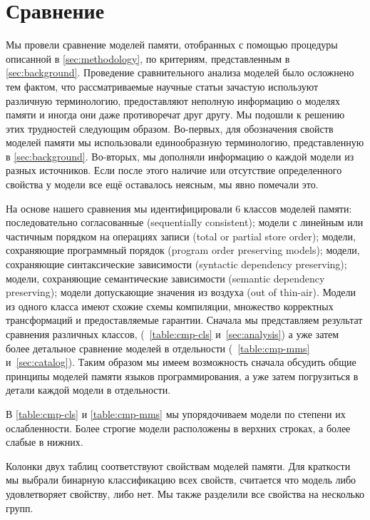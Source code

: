 \section{Сравнение}
\label{sec:comparison}

Мы провели сравнение моделей памяти, 
отобранных с помощью процедуры описанной в \cref{sec:methodology},
по критериям, представленным в \cref{sec:background}. 
Проведение сравнительного анализа моделей было 
осложнено тем фактом, что рассматриваемые 
научные статьи зачастую используют различную терминологию, 
предоставляют неполную информацию о моделях памяти 
и иногда они даже противоречат друг другу. 
Мы подошли к решению этих трудностей следующим образом. 
Во-первых, для обозначения свойств моделей памяти
мы использовали единообразную терминологию,
представленную в \cref{sec:background}.
Во-вторых, мы дополняли информацию о каждой модели 
из разных источников. Если после этого 
наличие или отсутствие определенного свойства у модели 
все ещё оставалось неясным, мы явно помечали это. 

На основе нашего сравнения мы идентифицировали 6 классов моделей памяти:
последовательно согласованные (sequentially consistent); 
модели с линейным или частичным порядком на операциях записи
(total or partial store order);
модели, сохраняющие программный порядок
(program order preserving models); 
модели, сохраняющие синтаксические зависимости 
(syntactic dependency preserving);
модели, сохраняющие семантические зависимости
(semantic dependency preserving);
модели допускающие значения из воздуха
(out of thin-air). 
Модели из одного класса имеют схожие схемы компиляции, 
множество корректных трансформаций и предоставляемые гарантии. 
Сначала мы представляем результат сравнения различных классов, 
(\see~\cref{table:cmp-cls} и~\cref{sec:analysis})
а уже затем более детальное сравнение моделей в отдельности
(\see~\cref{table:cmp-mms} и~\cref{sec:catalog}).
Таким образом мы имеем возможность сначала обсудить общие 
принципы моделей памяти языков программирования, 
а уже затем погрузиться в детали каждой модели в отдельности. 



В \cref{table:cmp-cls} и \cref{table:cmp-mms} 
мы упорядочиваем модели по степени их ослабленности. 
Более строгие модели расположены в верхних строках, 
а более слабые в нижних.  

Колонки двух таблиц соответствуют свойствам моделей памяти.
Для краткости мы выбрали бинарную классификацию всех свойств,
\ie считается что модель либо удовлетворяет свойству, либо нет. 
Мы также разделили все свойства на несколько групп. 


